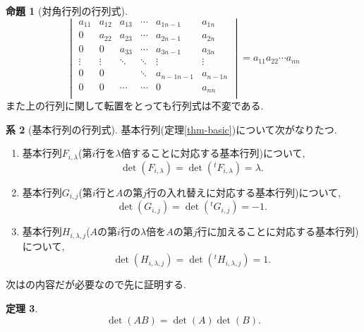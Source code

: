 \documentclass[dvipdfmx,a4paper,11pt]{article}
\theoremstyle{definition}
\newtheorem{thm}{定理}
\newtheorem{prop}[thm]{命題}
\newtheorem{cor}[thm]{系}
\begin{document}
 \begin{tcolorbox}[
    colback = white,
    colframe = green!35!black,
    fonttitle = \bfseries,
    breakable = true]
    \begin{prop}[対角行列の行列式]
   $$
\begin{vmatrix}
a_{11}& a_{12} & a_{13} &\cdots &a_{1n-1}&a_{1n} \\
0 	   & a_{22} & a_{23} &\cdots&a_{2n-1} &a_{2n} \\
0 	   & 0  		& a_{33} &\cdots &a_{3n-1}&a_{3n} \\
\vdots& \vdots	&  \ddots &\ddots&	\vdots  &	\vdots \\
0	& 0      		&      	&\ddots	&a_{n-1n-1} &a_{n-1n} \\
0	& 0      		&     \cdots	&	\cdots&0		&a_{nn} \\
\end{vmatrix}
=a_{11}a_{22}\cdots a_{nn}
$$
また上の行列に関して転置をとっても行列式は不変である. 
  \end{prop}
 \end{tcolorbox}
 
 \begin{tcolorbox}[
    colback = white,
    colframe = green!35!black,
    fonttitle = \bfseries,
    breakable = true]
    \begin{cor}[基本行列の行列式]
   基本行列(定理\ref{thm-basic})について次がなりたつ. 
 \begin{enumerate}
   \setlength{\parskip}{0cm} 
  \setlength{\itemsep}{0cm}
  \item 基本行列$F_{i,\lambda}$(第$i$行を$\lambda$倍することに対応する基本行列)について, 
  $$\det(F_{i,\lambda}) = \det({}^t F_{i,\lambda}) =\lambda.
  $$
 \item 基本行列$G_{i,j}$(第$i$行と$A$の第$j$行の入れ替えに対応する基本行列)について, 
   $$\det(G_{i,j}) = \det({}^t G_{i,j}) =-1.
  $$
 \item 基本行列$H_{i,\lambda, j}$($A$の第$i$行の$\lambda$倍を$A$の第$j$行に加えることに対応する基本行列)について,  
   $$\det(H_{i,\lambda, j}) = \det({}^t H_{i,\lambda, j}) =1.
  $$
 \end{enumerate}
  \end{cor}
  \end{tcolorbox}

次は\cite[3.4節]{M}の内容だが必要なので先に証明する.
\begin{tcolorbox}[
    colback = white,
    colframe = green!35!black,
    fonttitle = \bfseries,
    breakable = true]
    \begin{thm}\cite[定理3.9]{M}
    $$
    \det(AB)=\det(A)\det(B).
    $$
  \end{thm}
  \end{tcolorbox}
\end{document}
